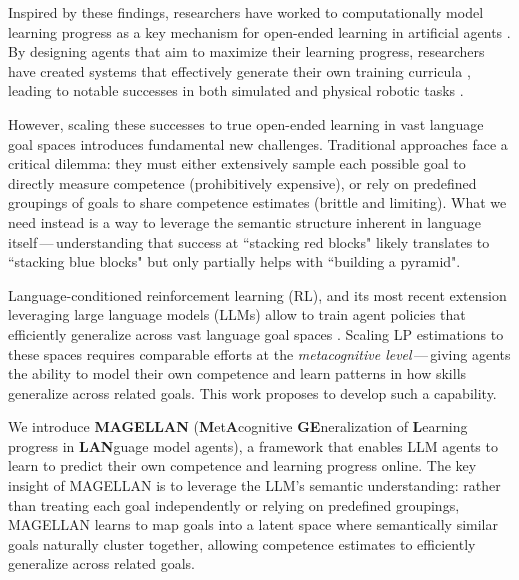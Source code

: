 Inspired by these findings, researchers have worked to computationally model learning progress as a key mechanism for open-ended learning in artificial agents \citep{schmidhuber_possibility_1991, kaplan2007progress, baranes_active_2013}. By designing agents that aim to maximize their learning progress, researchers have created systems that effectively generate their own training curricula \citep{portelas_automatic_2020,romac_teachmyagent_2021}, leading to notable successes in both simulated and physical robotic tasks \citep{colas_curious_2019, portelas_teacher_2019, kanitscheider_multi-task_2021, forestier_intrinsically_2022}. 

However, scaling these successes to true open-ended learning in vast language goal spaces introduces fundamental new challenges. Traditional approaches face a critical dilemma: they must either extensively sample each possible goal to directly measure competence (prohibitively expensive), or rely on predefined groupings of goals to share competence estimates (brittle and limiting). What we need instead is a way to leverage the semantic structure inherent in language itself\,---\,understanding that success at ``stacking red blocks" likely translates to ``stacking blue blocks" but only partially helps with ``building a pyramid".

Language-conditioned reinforcement learning (RL), and its most recent extension leveraging large language models (LLMs) allow to train agent policies that efficiently generalize across vast language goal spaces \cite{carta_grounding_2023, wen_entropy-regularized_2024, wen_reinforcing_2024}. Scaling LP estimations to these spaces requires comparable efforts at the \textit{metacognitive level}\,---\,\ie giving agents the ability to model their own competence and learn patterns in how skills generalize across related goals. This work proposes to develop such a capability. 

We introduce \textbf{MAGELLAN} (\textbf{M}et\textbf{A}cognitive \textbf{GE}neralization of \textbf{L}earning progress in \textbf{LAN}guage model agents), a framework that enables LLM agents to learn to predict their own competence and learning progress online. The key insight of MAGELLAN is to leverage the LLM's semantic understanding: rather than treating each goal independently or relying on predefined groupings, MAGELLAN learns to map goals into a latent space where semantically similar goals naturally cluster together, allowing competence estimates to efficiently generalize across related goals. 

